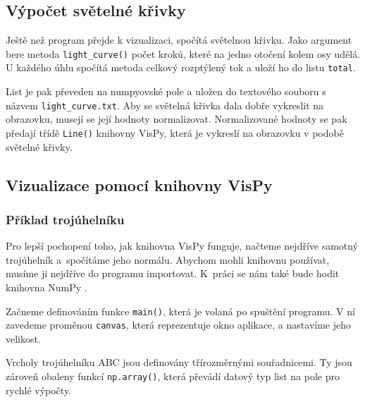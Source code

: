 \documentclass[11pt]{article}
\begin{document}
\subsection{Výpočet světelné křivky}

Ještě než program přejde k vizualizaci, spočítá světelnou křivku. Jako argument bere metoda \verb|light_curve()| počet kroků, které na jedno otočení kolem osy udělá. U každého úhlu spočítá metoda celkový rozptýlený tok a uloží ho do listu \verb|total|.



List je pak převeden na numpyovské pole a uložen do textového souboru s názvem \verb|light_curve.txt|. Aby se světelná křivka dala dobře vykreslit na obrazovku, musejí se její hodnoty normalizovat. Normalizované hodnoty se pak předají třídě \verb|Line()| knihovny VisPy, která je vykreslí na obrazovku v podobě světelné křivky.




\subsection{Vizualizace pomocí knihovny VisPy}

\subsubsection{Příklad trojúhelníku}

Pro lepší pochopení toho, jak knihovna VisPy funguje, načteme nejdříve samotný trojúhelník a~spočítáme jeho normálu. Abychom mohli knihovnu používat, musíme ji nejdříve do programu importovat. K~práci se nám také bude hodit knihovna NumPy \cite{numpy}.



Začneme definováním funkce \verb|main()|, která je volaná po spuštění programu. V ní zavedeme proměnou \verb|canvas|, která reprezentuje okno aplikace, a nastavíme jeho velikost.   



Vrcholy trojúhelníku ABC jsou definovány třírozměrnými souřadnicemi. Ty jsou zároveň obaleny funkcí \verb|np.array()|, která převádí datový typ list na pole pro rychlé výpočty.
\end{document}

